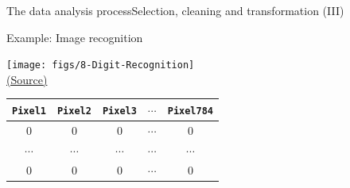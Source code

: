 \documentclass[10pt,compress]{beamer} %
\begin{document}
\begin{frame}[fragile]{The data analysis process}{Selection, cleaning and transformation (III)}
	\begin{exampleblock}{Example: Image recognition}
	 \vspace{-0.3cm}
		\begin{center}
		\texttt{[image: figs/8-Digit-Recognition]}\\
    	\tiny{\href{https://lucenaresearch.com/deep-neural-networks/}{(Source)}}
		\end{center}

		\begin{center}
		\begin{tabular}{ccccc}\hline
		 \texttt{Pixel1}& \texttt{Pixel2} & \texttt{Pixel3} & $\cdots$ & \texttt{Pixel784} \\\hline
		 0     & 0      & 0      & $\cdots$ & 0                  \\
		 $\cdots$ & $\cdots$ & $\cdots$ & $\cdots$   & $\cdots$  \\
		 0     & 0      & 0      & $\cdots$ & 0                  \\
		 \hline
	 	\end{tabular}
	 	\end{center}
	 \vspace{-0.3cm}
	 \end{exampleblock}
\end{frame}
\end{document}
